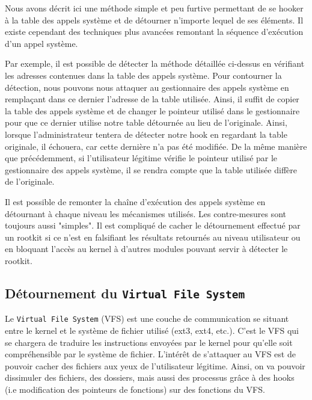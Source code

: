 \documentclass[12pt]{article}
\begin{document}
        Nous avons décrit ici une méthode simple et peu furtive permettant de se hooker à la table des appels système et de détourner n'importe lequel de ses éléments. Il existe cependant des techniques plus avancées remontant la séquence d'exécution d'un appel système.

        Par exemple, il est possible de détecter la méthode détaillée ci-dessus en vérifiant les adresses contenues dans la table des appels système. Pour contourner la détection, nous pouvons nous attaquer au gestionnaire des appels système en remplaçant dans ce dernier l'adresse de la table utilisée. Ainsi, il suffit de copier la table des appels système et de changer le pointeur utilisé dans le gestionnaire pour que ce dernier utilise notre table détournée au lieu de l'originale. Ainsi, lorsque l'administrateur tentera de détecter notre hook en regardant la table originale, il échouera, car cette dernière n'a pas été modifiée. De la même manière que précédemment, si l'utilisateur légitime vérifie le pointeur utilisé par le gestionnaire des appels système, il se rendra compte que la table utilisée diffère de l'originale. 
        
        Il est possible de remonter la chaîne d'exécution des appels système en détournant à chaque niveau les mécanismes utilisés. Les contre-mesures sont toujours aussi  "simples". Il est compliqué de cacher le détournement effectué par un rootkit si ce n'est en falsifiant les résultats retournés au niveau utilisateur ou en bloquant l'accès au kernel à d'autres modules pouvant servir à détecter le rootkit.


    \subsection{Détournement du \texttt{Virtual File System}}
    \label{sec:vfs}
    
        Le \texttt{Virtual File System} (VFS) est une couche de communication se situant entre le kernel et le système de fichier utilisé (ext3, ext4, etc.). C'est le VFS qui se chargera de traduire les instructions envoyées par le kernel pour qu'elle soit compréhensible par le système de fichier.
        L'intérêt de s'attaquer au VFS est de pouvoir cacher des fichiers aux yeux de l'utilisateur légitime. Ainsi, on va pouvoir dissimuler des fichiers, des dossiers, mais aussi des processus grâce à des hooks (i.e modification des pointeurs de fonctions) sur des fonctions du VFS. \\
\end{document}
